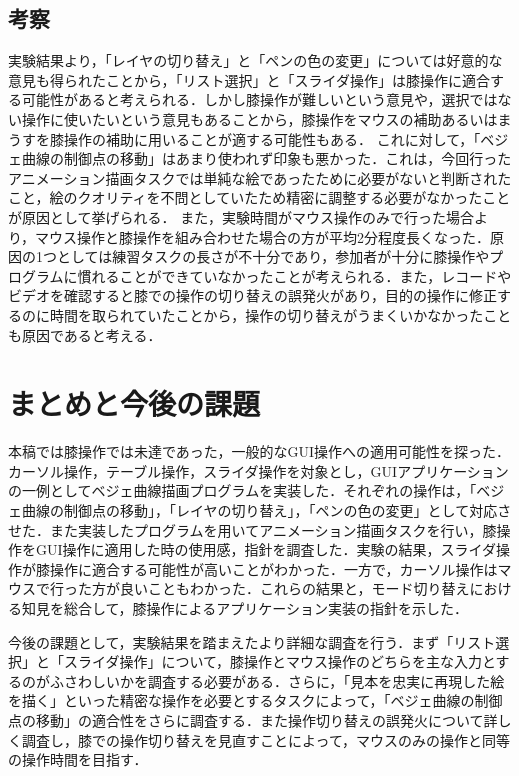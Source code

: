 \documentclass[submit, techrep]{ipsj}
\begin{document}
\subsection{考察}
実験結果より，「レイヤの切り替え」と「ペンの色の変更」については好意的な意見も得られたことから，「リスト選択」と「スライダ操作」は膝操作に適合する可能性があると考えられる．しかし膝操作が難しいという意見や，選択ではない操作に使いたいという意見もあることから，膝操作をマウスの補助あるいはまうすを膝操作の補助に用いることが適する可能性もある．
これに対して，「ベジェ曲線の制御点の移動」はあまり使われず印象も悪かった．これは，今回行ったアニメーション描画タスクでは単純な絵であったために必要がないと判断されたこと，絵のクオリティを不問としていたため精密に調整する必要がなかったことが原因として挙げられる．
また，実験時間がマウス操作のみで行った場合より，マウス操作と膝操作を組み合わせた場合の方が平均2分程度長くなった．原因の1つとしては練習タスクの長さが不十分であり，参加者が十分に膝操作やプログラムに慣れることができていなかったことが考えられる．また，レコードやビデオを確認すると膝での操作の切り替えの誤発火があり，目的の操作に修正するのに時間を取られていたことから，操作の切り替えがうまくいかなかったことも原因であると考える．
\section{まとめと今後の課題}
本稿では膝操作では未達であった，一般的なGUI操作への適用可能性を探った．カーソル操作，テーブル操作，スライダ操作を対象とし，GUIアプリケーションの一例としてベジェ曲線描画プログラムを実装した．それぞれの操作は，「ベジェ曲線の制御点の移動」，「レイヤの切り替え」，「ペンの色の変更」として対応させた．また実装したプログラムを用いてアニメーション描画タスクを行い，膝操作をGUI操作に適用した時の使用感，指針を調査した．実験の結果，スライダ操作が膝操作に適合する可能性が高いことがわかった．一方で，カーソル操作はマウスで行った方が良いこともわかった．これらの結果と，モード切り替えにおける知見を総合して，膝操作によるアプリケーション実装の指針を示した．

今後の課題として，実験結果を踏まえたより詳細な調査を行う．まず「リスト選択」と「スライダ操作」について，膝操作とマウス操作のどちらを主な入力とするのがふさわしいかを調査する必要がある．さらに，「見本を忠実に再現した絵を描く」といった精密な操作を必要とするタスクによって，「ベジェ曲線の制御点の移動」の適合性をさらに調査する．また操作切り替えの誤発火について詳しく調査し，膝での操作切り替えを見直すことによって，マウスのみの操作と同等の操作時間を目指す．

%
%
%




\begin{biography}

\end{biography}
\end{document}
